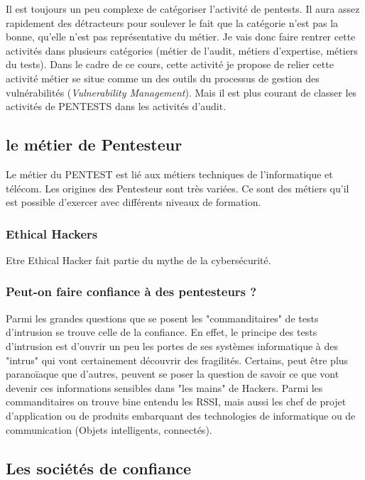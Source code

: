 Il est toujours un peu complexe de catégoriser l'activité de pentests. Il aura assez rapidement des détracteurs pour soulever le fait que la catégorie n'est pas la bonne, qu'elle n'est pas représentative du métier. 
Je vais donc faire rentrer cette activités dans plusieurs catégories (métier de l'audit, métiers d'expertise, métiers du tests).
Dans le cadre de ce cours, cette activité je propose de relier cette activité métier se situe comme un des outils du processus de gestion des vulnérabilités (\emph{Vulnerability Management}).  Mais il est plus courant de  classer les activités de PENTESTS dans les activités d'audit.

\subsection{le métier de Pentesteur}

Le métier du PENTEST est  lié aux métiers techniques de l'informatique et télécom. Les origines des Pentesteur sont très variées.
Ce sont des métiers qu'il est possible d'exercer avec différents niveaux de formation. 

\subsubsection{ Ethical Hackers}
Etre Ethical Hacker fait partie du mythe de la cybersécurité.

\subsubsection{Peut-on faire confiance à des pentesteurs ?}
Parmi les grandes questions que se posent les "commanditaires" de tests d'intrusion se trouve celle de la confiance.
En effet, le principe des tests d'intrusion est d'ouvrir un peu les portes de ses systèmes informatique à des "intrus" qui vont certainement découvrir des fragilités.
Certains, peut être plus paranoïaque que d'autres, peuvent se poser la question de savoir ce que vont devenir ces informations sensibles dans "les mains" de Hackers.
Parmi les commanditaires on trouve bine entendu les RSSI, mais aussi les chef de projet d'application ou de produits embarquant des technologies de informatique ou de communication (Objets intelligents, connectés).

\subsection{Les sociétés de confiance}

